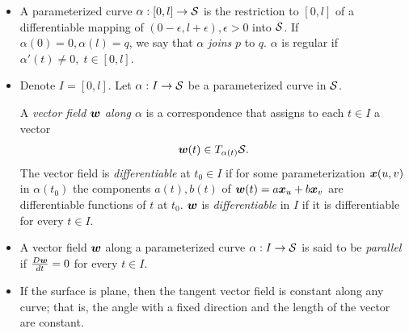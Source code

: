 \documentclass[11pt]{article}
\begin{document}
\begin{itemize}
\item A parameterized curve $\alpha: [0, l] \rightarrow {\mathcal S}$ is the restriction to $[0,l]$ of a differentiable mapping of $(0-\epsilon, l+\epsilon), \epsilon>0$ into ${\mathcal S}$. If $\alpha(0) = 0, \alpha(l) = q$, we say that $\alpha$ \emph{joins} $p$ to $q$. $\alpha$ is regular if $\alpha'(t)\neq 0, \;t\in [0,l]$.

\item Denote $I= [0,l]$. Let $\alpha: I\rightarrow {\mathcal S} $ be a parameterized curve in ${\mathcal S}$.   \begin{definition}
A \emph{vector field $\boldsymbol{w}$ along $\alpha$} is a correspondence that assigns to each $t\in I$ a vector 
\begin{align*}
\boldsymbol{w}(t) \in T_{\alpha(t)}{\mathcal S}.
\end{align*}
The vector field is \emph{differentiable} at $t_{0}\in I$ if for some parameterization $\boldsymbol{x}(u,v)$ in $\alpha(t_{0})$ the components $a(t), b(t)$ of $\boldsymbol{w}(t) = a\boldsymbol{x}_{u} + b\boldsymbol{x}_{v}$ are differentiable functions of $t$ at $t_{0}$. $\boldsymbol{w}$ is \emph{differentiable} in $I$ if it is differentiable for every $t\in I$.
\end{definition}


\item \begin{definition}
A vector field $\boldsymbol{w}$ along a parameterized curve $\alpha: I \rightarrow {\mathcal S}$ is said to be \emph{parallel} if $\frac{D\boldsymbol{w}}{dt} = 0$ for every $t\in I$.  
\end{definition}

\item \begin{remark} If the surface is plane, then the tangent vector field is constant along any curve; that is, the angle with a fixed direction and the length of the vector are constant. 


\end{remark}
\end{itemize}
\end{document}
